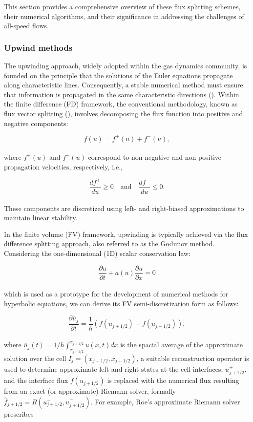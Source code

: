 \documentclass[a5paper]{sapthesis}
\begin{document}
	\noindent This section provides a comprehensive overview of these flux splitting schemes, their numerical algorithms, and their significance in addressing the challenges of all-speed flows.
	
	\subsubsection{Upwind methods}
	
	The upwinding approach, widely adopted within the gas dynamics community, is founded on the principle that the solutions of the Euler equations propagate along characteristic lines. Consequently, a stable numerical method must ensure that information is propagated in the same characteristic directions (\citet{MORETTI1979191}). Within the finite difference (FD) framework, the conventional methodology, known as flux vector splitting (\citet{STEGER1981263}), involves decomposing the flux function into positive and negative components:
	
	\begin{equation}
		f(u) = f^+(u) + f^-(u),
	\end{equation}
	\\
	where $f^+(u)$ and $f^-(u)$ correspond to non-negative and non-positive propagation velocities, respectively, i.e.,
	
	\begin{equation}
		\dfrac{df^+}{du} \geq 0 \quad \text{and} \quad \dfrac{df^-}{du} \leq 0.
	\end{equation}
	\\
	These components are discretized using left- and right-biased approximations to maintain linear stability.
	
	In the finite volume (FV) framework, upwinding is typically achieved via the flux difference splitting approach, also referred to as the Godunov method. Considering the one-dimensional (1D) scalar conservation law:
	
	\begin{equation}
		\dfrac{\partial u}{\partial t} + a(u) \dfrac{\partial u}{\partial x} = 0
		\label{conservationlaw}
	\end{equation}
	\\
	which is used as a prototype for the development of numerical methods for hyperbolic equations, we can derive its FV semi-discretization form as follows:
	
	\begin{equation}
		\dfrac{\partial \overline{u}_j}{\partial t} = \dfrac{1}{h}(f(u_{j+1/2}) - f(u_{j-1/2})),
	\end{equation}
	\\
	where $\overline{u}_j(t) = 1/h \int_{x_{j-1/2}}^{x_{j+1/2}} u(x,t) dx$ is the spacial average of the approximate solution over the cell $I_j = (x_{j-1/2},x_{j+1/2})$, a suitable reconstruction operator is used to determine approximate left and right states at the cell interfaces, $u_{j+1/2}^{\pm}$, and the interface flux $f(u_{j+1/2})$ is replaced with the numerical flux resulting from an exact (or approximate) Riemann solver, formally $\hat{f}_{j+1/2} = \textit{R}(u_{j+1/2}^{-},u_{j+1/2}^{+})$. For example, Roe's approximate Riemann solver prescribes 
	
\end{document}
